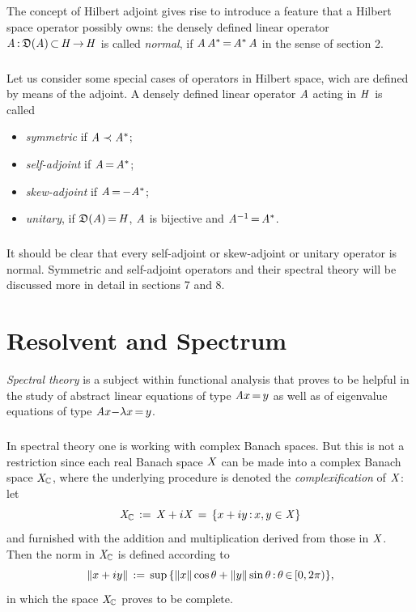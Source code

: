 \documentclass[11pt,twoside]{article}
\begin{document}
\subsection{} %
The concept of Hilbert adjoint gives rise to introduce a feature 
that a Hilbert space operator possibly owns:
the densely defined linear operator
$\mathit{A} {\,:\,} \mathfrak{D}(\mathit{A}) {\,\subset\,} \mathit{H} {\,\to\,} \mathit{H}$
is called \textit{normal},
if $\mathit{A} \, \mathit{A}^* {\,=\,} \mathit{A}^* \, \mathit{A}$ in the sense of section 2.

\subparagraph{} %
Let us consider some special cases of operators in Hilbert space,
wich are defined by means of the adjoint.
A densely defined linear operator $\mathit{A}$ acting in $\mathit{H}$ is called

\begin{itemize}[leftmargin=5mm]
\item[1.]
\textit{symmetric} if $\mathit{A} \prec \mathit{A}^*$;
\item[2.]
\textit{self-adjoint} if $\mathit{A} {\,=\,} \mathit{A}^*$;
\item[3.]
\textit{skew-adjoint} if $\mathit{A} {\,=\,} {-}\mathit{A}^*$;
\item[4.]
\textit{unitary},
if $\mathfrak{D}(\mathit{A}) {\,=\,} \mathit{H}$, $\mathit{A}$ is bijective
and $\mathit{A}^{-1} {\,=\,} \mathit{A}^*$.
\end{itemize}

\subparagraph{}
It should be clear
that every self-adjoint or skew-adjoint or unitary operator is normal.
Symmetric and self-adjoint operators and their spectral theory
will be discussed more in detail in sections 7 and 8.

\section{Resolvent and Spectrum}                                               %
\textit{Spectral theory} is a subject within functional analysis
that proves to be helpful in the study of abstract linear equations
of type $\mathit{A} x {\,=\,} y$
as well as of eigen\-value equations of type $\mathit{A} x {-} \lambda x {\,=\,} y$.

\subparagraph{} %
In spectral theory one is working with complex Banach spaces.
But this is not a restriction
since each real Banach space $\mathit{X}$ can be made
into a complex Banach space $\mathit{X}_{{\mathbb{C}}}$,
where the underlying procedure is denoted the \textit{complexification}
of $\mathit{X}$:
let 
\[
\mathit{X}_{{\mathbb{C}}} \,:=\, \mathit{X} + i \mathit{X} \,=\, \{ x+iy {\,:\,} x,y \in \mathit{X} \}
\]
and furnished with the addition and multiplication
derived from those in $\mathit{X}$.
Then the norm in $\mathit{X}_{{\mathbb{C}}}$ is defined according to
\[
\left\lVert x+iy \right\rVert \,:=\,
\sup \,
\{ \left\lVert x \right\rVert \cos \theta + \left\lVert y \right\rVert \sin \theta {\,:\,} \theta {\,\in\,} [0,2\pi) \},
\]
in which the space $\mathit{X}_{{\mathbb{C}}}$ proves to be complete.
\end{document}
